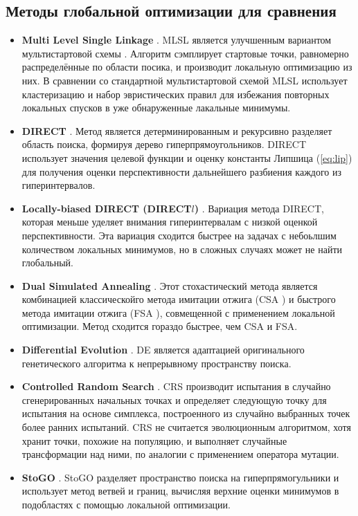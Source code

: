 \subsection{Методы глобальной оптимизации для сравнения}
\begin{itemize}
  \item \textbf{Multi Level Single Linkage} \cite{Kan1987StochasticGO}. MLSL является улучшенным вариантом мультистартовой схемы \cite{}.
  Алгоритм сэмплирует стартовые точки, равномерно распределённые по области посика, и производит локальную оптимизацию из них.
  В сравнении со стандартной мультистартовой схемой MLSL использует кластеризацию и набор эвристических правил
  для избежания повторных локальных спусков в уже обнаруженные лакальные минимумы.

  \item \textbf{DIRECT} \cite{Jones2009}. Метод является детерминированным и рекурсивно разделяет
  область поиска, формируя дерево гиперпрямоугольников. DIRECT использует значения целевой функции и
  оценку константы Липшица (\ref{eq:lip}) для получения оценки перспективности дальнейшего разбиения каждого из гиперинтервалов.

  \item \textbf{Locally-biased DIRECT (DIRECT$l$)} \cite{Gablonsky2001}. Вариация метода
  DIRECT, которая меньше уделяет внимания гиперинтервалам с низкой оценкой перспективности.
  Эта вариация сходится быстрее на задачах с небоьлшим количеством локальных минимумов,
  но в сложных случаях может не найти глобальный.

  \item \textbf{Dual Simulated Annealing} \cite{XIANG1997216}. Этот стохастический метода является комбинацией
  классическойго метода имитации отжига (CSA \cite{annealing}) и быстрого метода имитации отжига (FSA \cite{SZU1987157}), совмещенной
  с применением локальной оптимизации. Метод сходится гораздо быстрее, чем CSA и FSA.

  \item \textbf{Differential Evolution} \cite{Storn1997}. DE является адаптацией оригинального генетического алгоритма
  к непрерывному пространству поиска.

  \item \textbf{Controlled Random Search} \cite{Price1983}. CRS производит испытания в случайно сгенерированных начальных
  точках и определяет следующую точку для испытания на основе симплекса, построенного из случайно выбранных точек более ранних испытаний.
  CRS не считается эволюционным алгоритмом, хотя хранит точки, похожие на популяцию, и выполняет случайные трансформации над ними,
  по аналогии с применением оператора мутации.

  \item \textbf{StoGO} \cite{Madsen1998}. StoGO разделяет пространство поиска на гиперпрямогульники и использует метод ветвей и
  границ, вычисляя верхние оценки минимумов в подобластях с помощью локальной оптимизации.
\end{itemize}

